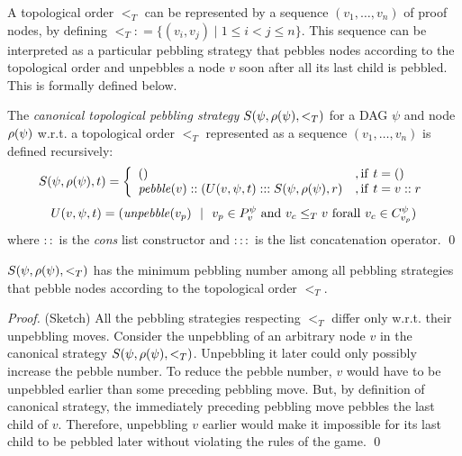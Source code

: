 \documentclass{llncs}
\newcommand{\defeq}{\mathrel{\mathop:}=}
\begin{document}
\noindent
A topological order $<_T$ can be represented by a sequence $(v_1,\dots,v_n)$ of proof nodes, by defining $<_T \defeq \{(v_i,v_j) \mid 1 \leq i < j \leq n\}$. This sequence can be interpreted as a particular pebbling strategy that pebbles nodes according to the topological order and unpebbles a node $v$ soon after all its last child is pebbled. This is formally defined below.

\newcommand{\cstrategy}[3]{S(#1,#2,#3)}

\begin{definition}
The \emph{canonical topological pebbling strategy} $\cstrategy{\psi}{\raiz{\psi}}{<_T}$ for a DAG $\psi$ and node $\rho(\psi)$ w.r.t. a topological order $<_T$ represented as a sequence $(v_1,\dots,v_n)$ is defined recursively:
$$
\cstrategy{\psi}{\raiz{\psi}}{t} = \left\{\begin{array}{ll}  
                 () & , \mathrm{if } \ t = () \\
                 \mathit{pebble}(v)::(U(v, \psi, t):::\cstrategy{\psi}{\raiz{\psi}}{r} & , \mathrm{if } \ t = v::r 
               \end{array}\right.
$$
$$
U(v, \psi, t) = (\mathit{unpebble}(v_p) \ \  | \ \ v_p \in \Premises{v}{\psi} \ \mathrm{and} \ v_c \leq_T v \ \mathrm{for all} \ v_c \in \Children{v_p}{\psi})
$$
%
where $::$ is the \emph{cons} list constructor and $:::$ is the list concatenation operator.
\qed
\end{definition}

\begin{theorem}
\label{theorem:canonical}
$\cstrategy{\psi}{\raiz{\psi}}{<_T}$ has the minimum pebbling number among all pebbling strategies that pebble nodes according to the topological order $<_T$.
\end{theorem}
\begin{proof} (Sketch)
All the pebbling strategies respecting $<_T$ differ only w.r.t. their unpebbling moves.
Consider the unpebbling of an arbitrary node $v$ in the canonical strategy $\cstrategy{\psi}{\raiz{\psi}}{<_T}$. Unpebbling it later could only possibly increase the pebble number. To reduce the pebble number, $v$ would have to be unpebbled earlier than some preceding pebbling move. But, by definition of canonical strategy, the immediately preceding pebbling move pebbles the last child of $v$. Therefore, unpebbling $v$ earlier would make it impossible for its last child to be pebbled later without violating the rules of the game.
\qed
\end{proof}
\end{document}

